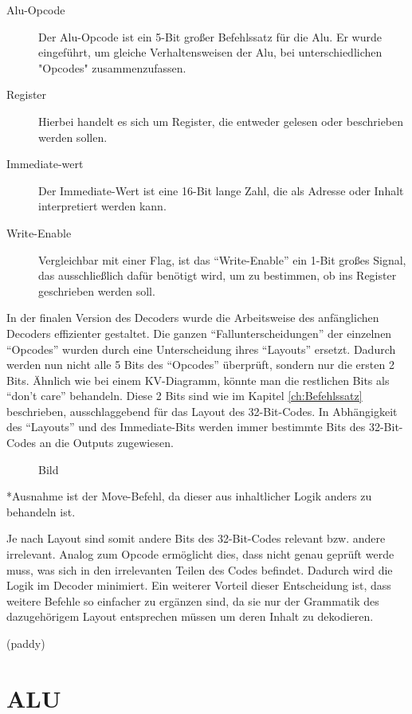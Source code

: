\documentclass[paper=a4,fontsize=12pt,twocolumn]{scrreprt}
\begin{document}
\begin{description}
  \item [Alu-Opcode] Der Alu-Opcode ist ein 5-Bit großer Befehlssatz für die Alu.
  Er wurde eingeführt, um gleiche Verhaltensweisen der Alu, bei unterschiedlichen "Opcodes" zusammenzufassen.
  \item [Register] Hierbei handelt es sich um Register, die entweder gelesen oder beschrieben werden sollen.
  \item [Immediate-wert] Der Immediate-Wert ist eine 16-Bit lange Zahl, die als Adresse oder Inhalt interpretiert werden kann.
  \item [Write-Enable] Vergleichbar mit einer Flag, ist das \enquote{Write-Enable} ein 1-Bit großes Signal, das ausschließlich dafür benötigt wird, um zu bestimmen, ob ins Register geschrieben werden soll.
\end{description}

In der finalen Version des Decoders wurde die Arbeitsweise des anfänglichen Decoders effizienter gestaltet.
Die ganzen \enquote{Fallunterscheidungen} der einzelnen \enquote{Opcodes} wurden durch eine Unterscheidung ihres \enquote{Layouts} ersetzt.
Dadurch werden nun nicht alle 5 Bits des \enquote{Opcodes} überprüft, sondern nur die ersten 2 Bits.
Ähnlich wie bei einem KV-Diagramm, könnte man die restlichen Bits als \enquote{don't care} behandeln.
Diese 2 Bits sind wie im Kapitel \ref{ch:Befehlssatz} beschrieben, ausschlaggebend für das Layout des 32-Bit-Codes.
In Abhängigkeit des \enquote{Layouts} und des Immediate-Bits werden immer bestimmte Bits des 32-Bit-Codes an die Outputs zugewiesen.

\begin{figure}[h]
\centering
\caption{Bild}
\end{figure}

*Ausnahme ist der Move-Befehl, da dieser aus inhaltlicher Logik anders zu behandeln ist.

Je nach Layout sind somit andere Bits des 32-Bit-Codes relevant bzw. andere irrelevant.
Analog zum Opcode ermöglicht dies, dass nicht genau geprüft werde muss, was sich in den irrelevanten Teilen des Codes befindet.
Dadurch wird die Logik im Decoder minimiert. 
Ein weiterer Vorteil dieser Entscheidung ist, dass weitere Befehle so einfacher zu ergänzen sind, da sie nur der Grammatik des dazugehörigem Layout entsprechen müssen um deren Inhalt zu dekodieren.  


(paddy)

\section{ALU}
\end{document}

